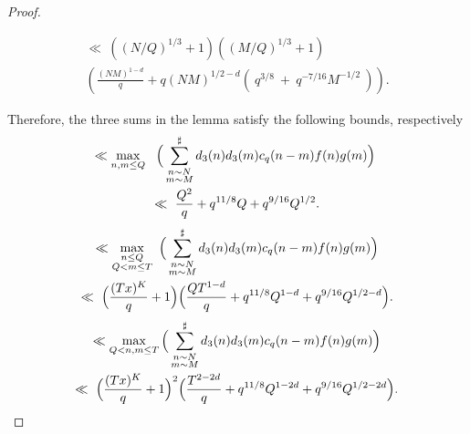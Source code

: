 \documentclass[oneside,reqno,10pt]{amsart}
\numberwithin{equation}{section}
\theoremstyle{plain}
\theoremstyle{definition}
\numberwithin{equation}{section}
\begin{document}
\begin{proof}
\begin{enumerate}
    \begin{multline*}
     \ll\ \left((N/Q)^{1/3} + 1\right) \left((M/Q)^{1/3} + 1\right)\\ \left(\frac{(NM)^{1-d}}{q} + q(NM)^{1/2-d} (\ q^{3/8}\ +\ q^{-7/16}M^{-1/2}\ )\right).   
    \end{multline*}
\end{enumerate}
Therefore, the three sums in the lemma satisfy the following bounds, respectively
\begin{multline*}
    \ll \max_{\substack{n,m\leq Q}}\ \ \Big(\sum_{\begin{subarray}{c}n \sim N \\ m \sim M\end{subarray}}^{\sharp} d_{3}(n)d_{3}(m)c_{q}(n-m)f(n)g(m) \Big)\ \\  \ll\ \frac{Q^2}{q}+q^{11/8}Q+q^{9/16}Q^{1/2}.
\end{multline*}
 \begin{multline*}
        \ll \max_{\substack{n\leq Q\\Q<m\leq T}}\ \Big(\sum_{\begin{subarray}{c}n \sim N \\ m \sim M\end{subarray}}^{\sharp} d_{3}(n)d_{3}(m)c_{q}(n-m)f(n)g(m) \Big)\\ 
        \ll \ \Big( \frac{(Tx)^{K}}{q}+1\Big) \Big( \frac{QT^{1-d}}{q}+q^{11/8}Q^{1-d}+q^{9/16}Q^{1/2-d}\Big).\\
    \end{multline*}
\begin{multline*}
    \ll \max_{\substack{Q<n,m\leq T}}\Big(\sum_{\begin{subarray}{c}n \sim N \\ m \sim M\end{subarray}}^{\sharp} d_{3}(n)d_{3}(m)c_{q}(n-m)f(n)g(m) \Big)\\
    \ll\ \Big( \frac{(Tx)^{K}}{q}+1\Big)^2 \Big( \frac{T^{2-2d}}{q}+q^{11/8}Q^{1-2d}+q^{9/16}Q^{1/2-2d}\Big).
\end{multline*}
\end{proof}


\end{document}
